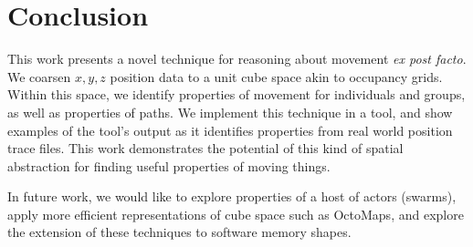 \section{Conclusion}
\label{sec:conclusion}

This work presents a novel technique for reasoning about movement \emph{ex post facto}.
We coarsen $x,y,z$ position data to a unit cube space akin to occupancy grids.
Within this space, we identify properties of movement for individuals and groups, as well as properties of paths.
We implement this technique in a tool, and show examples of the tool's output as it identifies properties from real world position trace files.
This work demonstrates the potential of this kind of spatial abstraction for finding useful properties of moving things.

In future work, we would like to explore properties of a host of actors (swarms), apply more efficient representations of cube space such as OctoMaps, and explore the extension of these techniques to software memory shapes.


